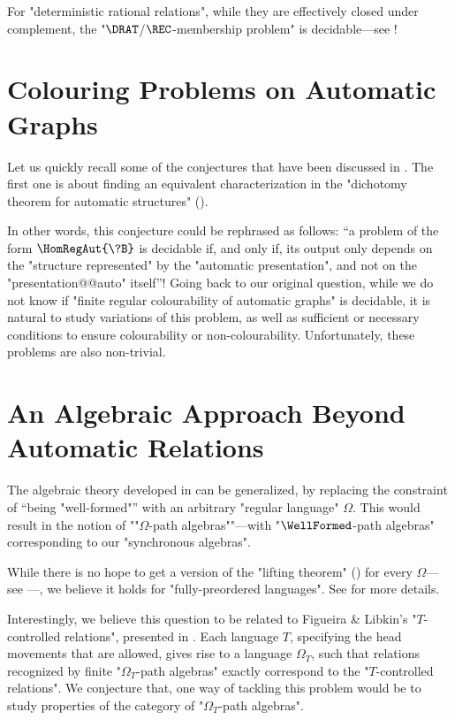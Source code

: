 For "deterministic rational relations", while they are effectively
closed under complement, the "$\DRAT$/$\REC$-membership problem"
is decidable---see !

\section{Colouring Problems on Automatic Graphs}

Let us quickly recall some of the conjectures that have been discussed in .
The first one is about finding an equivalent characterization in the "dichotomy theorem
for automatic structures" ().

\conjInvarianceGraphIsomorphisms*

In other words, this conjecture could be rephrased as follows: ``a problem
of the form $\HomRegAut{\?B}$ is decidable if, and only if, its output
only depends on the "structure represented" by the "automatic presentation",
and not on the "presentation@@auto" itself''!
Going back to our original question,
while we do not know if "finite regular colourability of automatic graphs"
is decidable, it is natural to study variations of this problem, as well as
sufficient or necessary conditions to ensure colourability or non-colourability.
Unfortunately, these problems are also non-trivial.

\conjFiniteColourabilityUndecidable*

\conjUnboundedCliques*

\section{An Algebraic Approach Beyond Automatic Relations}

The algebraic theory developed in  can be generalized,
by replacing the constraint of ``being "well-formed"'' with an arbitrary
"regular language" $\Omega$. This would result in the notion
of \AP""$\Omega$-path algebras""---with "$\WellFormed$-path algebras" corresponding
to our "synchronous algebras".

While there is no hope to get a version of the
"lifting theorem" () for every $\Omega$---see ---, we believe it holds for "fully-preordered languages".
See  for more details.

Interestingly, we believe this question to be related to Figueira \& Libkin's
"$T$-controlled relations", presented in
.
Each language $T$, specifying the head movements that are allowed,
gives rise to a language $\Omega_T$, such that relations recognized
by finite "$\Omega_T$-path algebras" exactly correspond to 
the "$T$-controlled relations".
\opbControlledRelations
We conjecture that, one way of tackling this problem would be to study properties of
the category of "$\Omega_T$-path algebras".

